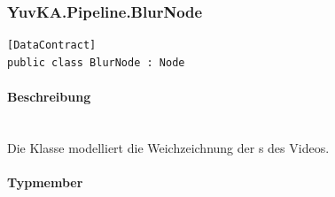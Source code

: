 \subsubsection{YuvKA.Pipeline.BlurNode}

\begin{verbatim}
[DataContract]
public class BlurNode : Node
\end{verbatim}

\paragraph{Beschreibung}~\\
Die Klasse  modelliert die Weichzeichnung der s des Videos.

\paragraph{Typmember}

